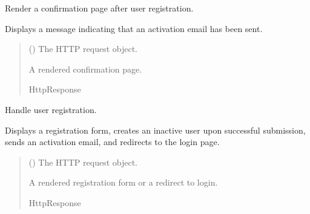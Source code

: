 \documentclass[letterpaper,10pt,english]{sphinxmanual}
\begin{document}
\begin{fulllineitems}
\label{\detokenize{users:users.views.confirm_activation}}
\pysigstartsignatures
\pysiglinewithargsret
{}
{}
{}
\pysigstopsignatures
\sphinxAtStartPar
Render a confirmation page after user registration.

\sphinxAtStartPar
Displays a message indicating that an activation email has been sent.
\begin{quote}\begin{description}
\sphinxAtStartPar
{} () \textendash{} The HTTP request object.

\sphinxAtStartPar
A rendered confirmation page.

\sphinxAtStartPar
HttpResponse

\end{description}\end{quote}

\end{fulllineitems}


\begin{fulllineitems}
\label{\detokenize{users:users.views.register_view}}
\pysigstartsignatures
\pysiglinewithargsret
{}
{}
{}
\pysigstopsignatures
\sphinxAtStartPar
Handle user registration.

\sphinxAtStartPar
Displays a registration form, creates an inactive user upon successful submission,
sends an activation email, and redirects to the login page.
\begin{quote}\begin{description}
\sphinxAtStartPar
{} () \textendash{} The HTTP request object.

\sphinxAtStartPar
A rendered registration form or a redirect to login.

\sphinxAtStartPar
HttpResponse

\end{description}\end{quote}

\end{fulllineitems}
\end{document}
